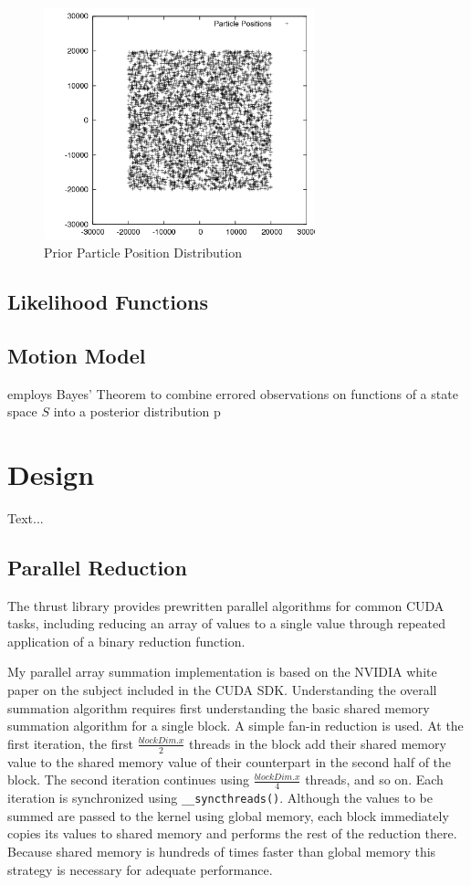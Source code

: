 \documentclass{article}
\begin{document}
\begin{figure}
\centering
\includegraphics[width=0.7\textwidth]{data/particles_prior.png}
\caption{Prior Particle Position Distribution}
\label{prior}
\end{figure}

\subsection{Likelihood Functions}


\subsection{Motion Model}


 employs Bayes' Theorem to combine errored observations on functions of a state space \(S\) into a posterior distribution p

\section{Design}
Text...
\subsection{Parallel Reduction}
The thrust library provides prewritten parallel algorithms for common CUDA tasks, including reducing an array of values to a single value through repeated application of a binary reduction function.\cite{thrust}

My parallel array summation implementation is based on the NVIDIA white paper on the subject included in the CUDA SDK.\cite{oprc} Understanding the overall summation algorithm requires first understanding the basic shared memory summation algorithm for a single block. A simple fan-in reduction is used. At the first iteration, the first \(\frac{blockDim.x}{2}\) threads in the block add their shared memory value to the shared memory value of their counterpart in the second half of the block. The second iteration continues using \(\frac{blockDim.x}{4}\) threads, and so on. Each iteration is synchronized using \verb!__syncthreads()!. Although the values to be summed are passed to the kernel using global memory, each block immediately copies its values to shared memory and performs the rest of the reduction there. Because shared memory is hundreds of times faster than global memory\cite{tutorial1} this strategy is necessary for adequate performance.
\end{document}
